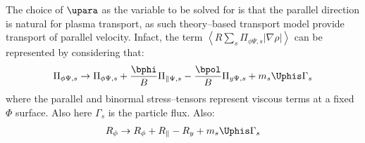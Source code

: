 The choice of $\upara$ as the variable to be solved for is that the parallel direction is natural for plasma transport, as such theory--based transport model provide transport of parallel velocity.
Infact, the term $\displaystyle \left\langle R \sum_s \Pi_{\phi\Psi,s}
|\nabla{\rho}| \right\rangle$ can be represented by considering that:
\begin{eqnarray}
 \Pi_{\phi\Psi,s} \rightarrow  \Pi_{\phi\Psi,s}+\frac{\bphi}{B}\Pi_{\parallel\Psi,s}-\frac{\bpol}{B}\Pi_{y\Psi,s}+m_s \Uphis \Gamma_s
\label{stresstensorparperp}
\end{eqnarray}
where the parallel and binormal stress--tensors represent viscous terms at a fixed $\Phi$ surface. Also here $\Gamma_s$ is the particle flux.
Also:
\begin{eqnarray}
R_\phi \rightarrow  R_\phi+R_\parallel-R_y+m_s \Uphis \Gamma_s
\label{stresstensorparperp}
\end{eqnarray}



